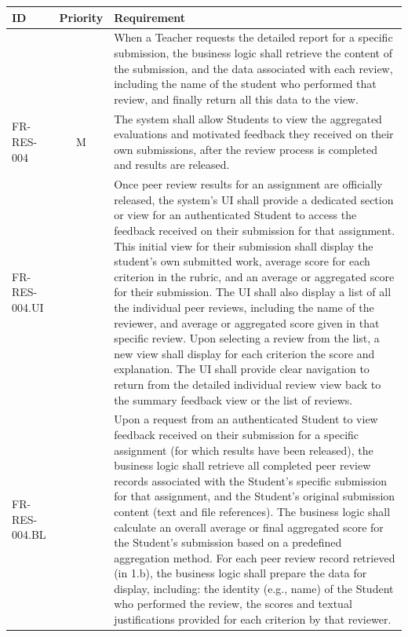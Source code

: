 \clearpage
\begin{longtable}{|l|c|p{10cm}|}
    \hline
    \textbf{ID} & \textbf{Priority} & \textbf{Requirement} \\
    \endhead %
    \hline
     & & When a Teacher requests the detailed report for a specific submission, the business logic shall retrieve the content of the submission, and the data associated with each review, including the name of the student who performed that review, and finally return all this data to the view. \\
    \hline
    FR-RES-004 & M & The system shall allow Students to view the aggregated evaluations and motivated feedback they received on their own submissions, after the review process is completed and results are released. \\
    \quad FR-RES-004.UI &  & \quad Once peer review results for an assignment are officially released, the system's UI shall provide a dedicated section or view for an authenticated Student to access the feedback received on their submission for that assignment. This initial view for their submission shall display the student’s own submitted work, average score for each criterion in the rubric, and an average or aggregated score for their submission. The UI shall also display a list of all the individual peer reviews, including the name of the reviewer, and average or aggregated score given in that specific review. Upon selecting a review from the list, a new view shall display for each criterion the score and explanation. The UI shall provide clear navigation to return from the detailed individual review view back to the summary feedback view or the list of reviews. \\
    \quad FR-RES-004.BL &  & \quad Upon a request from an authenticated Student to view feedback received on their submission for a specific assignment (for which results have been released), the business logic shall retrieve all completed peer review records associated with the Student's specific submission for that assignment, and the Student's original submission content (text and file references). The business logic shall calculate an overall average or final aggregated score for the Student's submission based on a predefined aggregation method. For each peer review record retrieved (in 1.b), the business logic shall prepare the data for display, including: the identity (e.g., name) of the Student who performed the review, the scores and textual justifications provided for each criterion by that reviewer. \\
    \hline
\end{longtable}

